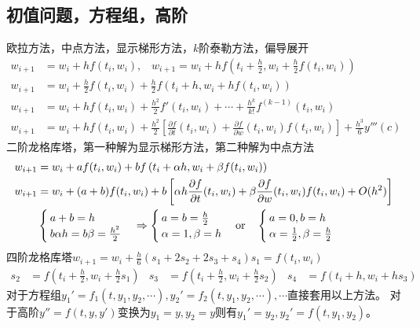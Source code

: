 \documentclass[twocolumn]{article}
\begin{document}
\subsection{初值问题，方程组，高阶}
欧拉方法，中点方法，显示梯形方法，$k$阶泰勒方法，偏导展开
\begin{align*}
    w_{i+1} & =w_i+hf(t_i,w_i),\,\,\,\,\, w_{i+1}=w_i+hf\left(t_i+\frac{h}{2},w_i+\frac{h}{2}f(t_i,w_i)\right)                                            \\
    w_{i+1} & =w_{i}+\frac{h}{2}f(t_i,w_i)+\frac{h}{2}f\left(t_i+h,w_i+hf(t_i,w_i)\right)                                                                 \\
    w_{i+1} & =w_i+hf(t_i,w_i)+\frac{h^2}{2}f'(t_i,w_i)+\cdots+\frac{h^k}{k!}f^{(k-1)}(t_i,w_i)                                                           \\
    w_{i+1} & =w_i+hf(t_i,w_i)+\frac{h^2}{2}\left[ \frac{\partial f}{\partial t}(t_i,w_i)+\frac{\partial f}{\partial w}(t_i,w_i)f(t_i,w_i) \right]+\frac{h^3}{6}y'''(c)
\end{align*}
二阶龙格库塔，第一种解为显示梯形方法，第二种解为中点方法
\begin{align*}
    w_{i+1} & =w_i+af(t_i,w_i)+bf\left(t_i+\alpha h,w_i+\beta f(t_i,w_i)\right)                                                           \\
    w_{i+1} & =w_i+(a+b)f(t_i,w_i)+b\left[ \alpha h\frac{\partial f}{\partial t}(t_i,w_i)+\beta\frac{\partial f}{\partial w}(t_i,w_i)f(t_i,w_i)+O(h^2) \right] \\
            &
    \begin{cases}
        a+b=h \\
        b\alpha h=b\beta=\frac{h^2}{2}
    \end{cases}
    \Rightarrow
    \begin{cases}
        a=b=\frac{h}{2} \\
        \alpha=1,\beta=h
    \end{cases}
    \text{or\quad}
    \begin{cases}
        a=0,b=h \\
        \alpha=\frac{1}{2},\beta=\frac{h}{2}
    \end{cases}
\end{align*}
四阶龙格库塔\qquad$w_{i+1}=w_i+\frac{h}{6}(s_1+2s_2+2s_3+s_4)$\qquad$s_1=f(t_i,w_i)$
\begin{align*}
    s_2 & =f\left( t_i+\frac{h}{2},w_i+\frac{h}{2}s_1 \right) & s_3 & =f\left( t_i+\frac{h}{2},w_i+\frac{h}{2}s_2 \right) & s_4 & =f\left( t_i+h,w_i+hs_3 \right)
\end{align*}
对于方程组$y_1'=f_1(t,y_1,y_2,\cdots),y_2'=f_2(t,y_1,y_2,\cdots),\cdots$直接套用以上方法。
\newline
对于高阶$y''=f(t,y,y')$变换为$y_1=y,y_2=y$则有$y_1'=y_2,y_2'=f(t,y_1,y_2)$。
\end{document}
